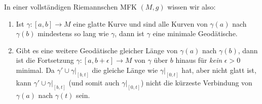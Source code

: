 In einer vollständigen Riemannschen MFK $(M,g)$ wissen wir also:
\begin{enumerate}
\item Ist $\gamma: [a,b] \to M$ eine glatte Kurve und sind alle Kurven von $\gamma(a)$ nach $\gamma(b)$ mindestens so lang wie $\gamma$, dann ist $\gamma$ eine minimale Geodätische.
\item Gibt es eine weitere Geodätische gleicher Länge von $\gamma(a)$ nach $\gamma(b)$, dann ist die Fortsetzung $\gamma: [a, b+\epsilon] \to M$ von $\gamma$ über $b$ hinaus für \textit{kein} $\epsilon > 0$ minimal. Da $\gamma' \cup \gamma|_{[b,t]}$ die gleiche Länge wie $\gamma|_{[0,t]}$ hat, aber nicht glatt ist, kann $\gamma' \cup \gamma|_{[b,t]}$ (und somit auch $\gamma|_{[0,t]}$) nicht die kürzeste Verbindung von $\gamma(a)$ nach $\gamma(t)$ sein.
\end{enumerate}
